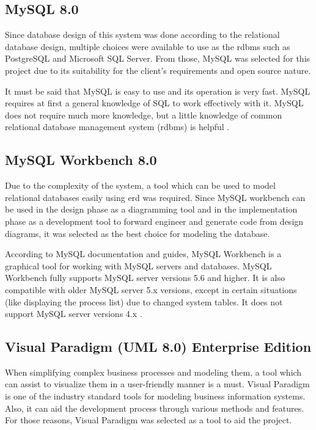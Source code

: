 \documentclass[12pt]{report}
\begin{document}
\subsection{MySQL 8.0}
Since database design of this system was done according to the relational database design, multiple choices were available to use as the \acrlong{rdbms} such as PostgreSQL and Microsoft SQL Server. From those, MySQL was selected for this project due to its suitability for the client's requirements and open source nature.

It must be said that MySQL is easy to use and its operation is very fast. MySQL requires at
first a general knowledge of SQL to work effectively with it. MySQL does not require much
more knowledge, but a little knowledge of common relational database management
system (\acrshort{rdbms}) is helpful \cite{vanier_2019_mysql8}.

\subsection{MySQL Workbench 8.0}
Due to the complexity of the system, a tool which can be used to model relational databases easily using \acrshort{erd} was required. Since MySQL workbench can be used in the design phase as a diagramming tool and in the implementation phase as a development tool to forward engineer and generate code from design diagrams, it was selected as the best choice for modeling the database.

According to MySQL documentation and guides, MySQL Workbench is a graphical tool for working with MySQL servers and databases. MySQL Workbench fully supports MySQL server versions 5.6 and higher. It is also compatible with older MySQL server 5.x versions, except in certain situations (like displaying the process list) due to changed system tables. It does not support MySQL server versions 4.x \cite{mclaughlin_2013_mysql}.

\subsection{Visual Paradigm (UML 8.0) Enterprise Edition}
When simplifying complex business processes and modeling them, a tool which can assist to visualize them in a user-friendly manner is a must. Visual Paradigm is one of the industry standard tools for modeling business information systems. Also, it can aid the development process through various methods and features. For those reasons, Visual Paradigm was selected as a tool to aid the project.
\end{document}
